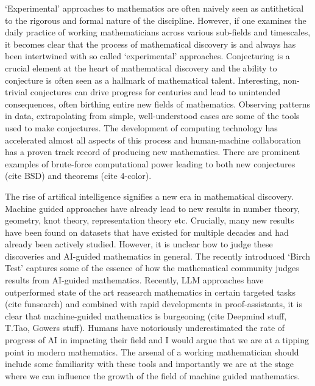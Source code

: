 `Experimental' approaches to mathematics are often naively seen as antithetical to the rigorous and formal nature of the discipline. However, if one examines the daily practice of working mathematicians across various sub-fields and timescales, it becomes clear that the process of mathematical discovery is and always has been intertwined with so called `experimental' approaches.
Conjecturing is a crucial element at the heart of mathematical discovery and the ability to conjecture is often seen as a hallmark of mathematical talent. Interesting, non-trivial conjectures can drive progress for centuries and lead to unintended consequences, often birthing entire new fields of mathematics. Observing patterns in data, extrapolating from simple, well-understood cases are some of the tools used to make conjectures.
The development of computing technology has accelerated almost all aspects of this process and human-machine collaboration has a proven track record of producing new mathematics. There are prominent examples of brute-force computational power leading to both new conjectures (cite {BSD}) and theorems (cite {4-color}). 
\par
The rise of artifical intelligence signifies a new era in mathematical discovery. Machine guided approaches have already lead to new results in number theory, geometry, knot theory, representation theory etc. Crucially, many new results have been found on datasets that have existed for multiple decades and had already been actively studied. However, it is unclear how to judge these discoveries and AI-guided mathematics in general. The recently introduced `Birch Test' \cite{heTriumvirateAIDriven2024} captures some of the essence of
how the mathematical community judges results from AI-guided mathematics.
Recently, LLM approaches have outperformed state of the art reasearch mathematics in certain 
targeted tasks (cite {funsearch}) and combined with rapid developments in proof-assistants, it is clear that machine-guided mathematics is burgeoning (cite {Deepmind stuff, T.Tao, Gowers stuff}).
Humans have notoriously underestimated the rate of progress of AI in impacting their field and I would argue that we are at a tipping point in modern mathematics. The arsenal of a working mathematician should include some familiarity with these tools and importantly we are at the stage where we can influence the growth of the field of machine guided mathematics.

